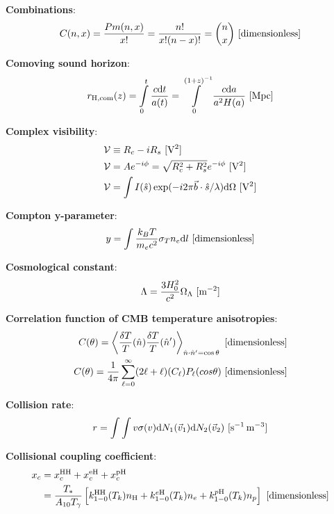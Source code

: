 \documentclass[a4paper,10pt]{article}
\begin{document}
{\noindent}\textbf{Combinations}:
\begin{align*}
    C(n,x) = \frac{Pm(n,x)}{x!} = \frac{n!}{x!(n-x)!} = \binom{n}{x} ~ [{\rm dimensionless}]
\end{align*}

{\noindent}\textbf{Comoving sound horizon}:
\begin{align*}
    r_\mathrm{H,com}(z) = \int\limits_0^t \frac{c\mathrm{d}t}{a(t)} = \int\limits_0^{(1+z)^{-1}} \frac{c\mathrm{d}a}{a^2H(a)} ~ [{\rm Mpc}]
\end{align*}

{\noindent}\textbf{Complex visibility}:
\begin{align*}
    \mathcal{V} &\equiv R_c - i R_s ~ [{\rm V^2}] \\
    \mathcal{V} &= Ae^{-i\phi} = \sqrt{R_c^2 + R_s^2} e^{-i\phi} ~ [{\rm V^2}] \\
    \mathcal{V} &= \int I(\hat{s}) \exp (-i2\pi\vec{b}\cdot\hat{s}/\lambda){\rm d}\Omega ~ [{\rm V^2}]
\end{align*}

{\noindent}\textbf{Compton y-parameter}:
\begin{align*}
    y = \int\frac{k_BT}{m_ec^2}\sigma_Tn_e\mathrm{d}l ~ [{\rm dimensionless}]
\end{align*}

{\noindent}\textbf{Cosmological constant}:
\begin{align*}
    \Lambda = \frac{3H_0^2}{c^2}\Omega_\Lambda ~ [{\rm m^{-2}}]
\end{align*}

{\noindent}\textbf{Correlation function of CMB temperature anisotropies}:
\begin{align*}
    C(\theta) = \left\langle\frac{\delta T}{T}(\hat{n})\frac{\delta T}{T}(\hat{n}')\right\rangle_{\hat{n}\cdot\hat{n}'=\cos\theta}  ~ [{\rm dimensionless}] \\
    C(\theta) = \frac{1}{4\pi} \sum\limits_{\ell=0}^\infty (2\ell+\ell)(C_\ell)P_\ell(cos\theta) ~ [{\rm dimensionless}]
\end{align*}

{\noindent}\textbf{Collision rate}:
\begin{align*}
    r = \int\int v\sigma(v){\rm d}N_1(\vec{v}_1){\rm d}N_2(\vec{v}_2) ~ [{\rm s^{-1}\,m^{-3}}]
\end{align*}

{\noindent}\textbf{Collisional coupling coefficient}:
\begin{align*}
    x_c &= x_c^\mathrm{HH} + x_c^\mathrm{eH} + x_c^\mathrm{pH} \\
        &= \frac{T_*}{A_{10}T_\gamma} \left[k_{1-0}^\mathrm{HH}(T_k)n_\mathrm{H}+k_{1-0}^{e\mathrm{H}}(T_k)n_e+k_{1-0}^{p\mathrm{H}}(T_k)n_p\right] ~ [{\rm dimensionless}]
\end{align*}
\end{document}
